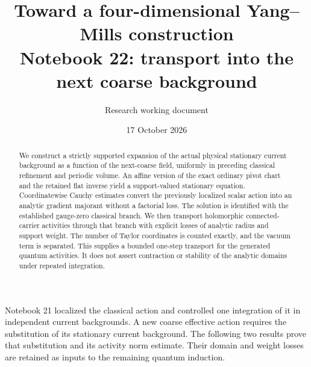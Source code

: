 \documentclass[11pt]{article}
\title{Toward a four-dimensional Yang--Mills construction\\
\large Notebook 22: transport into the next coarse background}
\author{Research working document}
\date{17 October 2026}
\theoremstyle{remark}
\begin{document}
\maketitle
\begin{abstract}
We construct a strictly supported expansion of the actual physical
stationary current background as a function of the next-coarse
field, uniformly in preceding classical refinement and periodic
volume. An affine version of the exact ordinary pivot chart and
the retained flat inverse yield a support-valued stationary
equation. Coordinatewise Cauchy estimates convert the previously
localized scalar action into an analytic gradient majorant without
a factorial loss. The solution is identified with the established
gauge-zero classical branch. We then transport holomorphic
connected-carrier activities through that branch with explicit
losses of analytic radius and support weight. The number of
Taylor coordinates is counted exactly, and the vacuum term is
separated. This supplies a bounded one-step transport for the
generated quantum activities. It does not assert contraction
or stability of the analytic domains under repeated integration.
\end{abstract}

Notebook 21 localized the classical action and controlled one
integration of it in independent current backgrounds. A new
coarse effective action requires the substitution of its
stationary current background. The following two results prove
that substitution and its activity norm estimate. Their domain
and weight losses are retained as inputs to the remaining
quantum induction.
\end{document}
